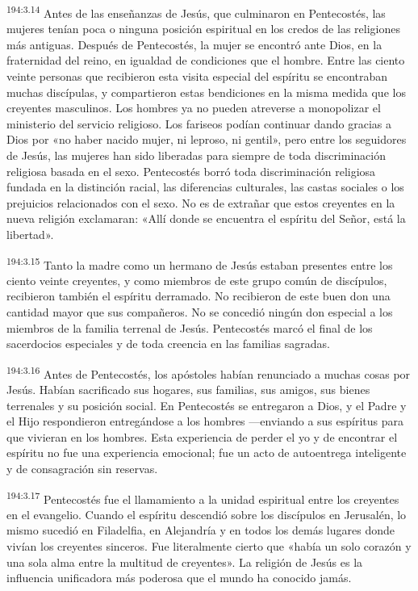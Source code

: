 \par 
\textsuperscript{194:3.14} Antes de las enseñanzas de Jesús, que culminaron en Pentecostés, las mujeres tenían poca o ninguna posición espiritual en los credos de las religiones más antiguas. Después de Pentecostés, la mujer se encontró ante Dios, en la fraternidad del reino, en igualdad de condiciones que el hombre. Entre las ciento veinte personas que recibieron esta visita especial del espíritu se encontraban muchas discípulas, y compartieron estas bendiciones en la misma medida que los creyentes masculinos. Los hombres ya no pueden atreverse a monopolizar el ministerio del servicio religioso. Los fariseos podían continuar dando gracias a Dios por «no haber nacido mujer, ni leproso, ni gentil», pero entre los seguidores de Jesús, las mujeres han sido liberadas para siempre de toda discriminación religiosa basada en el sexo. Pentecostés borró toda discriminación religiosa fundada en la distinción racial, las diferencias culturales, las castas sociales o los prejuicios relacionados con el sexo. No es de extrañar que estos creyentes en la nueva religión exclamaran: «Allí donde se encuentra el espíritu del Señor, está la libertad».

\par 
\textsuperscript{194:3.15} Tanto la madre como un hermano de Jesús estaban presentes entre los ciento veinte creyentes, y como miembros de este grupo común de discípulos, recibieron también el espíritu derramado. No recibieron de este buen don una cantidad mayor que sus compañeros. No se concedió ningún don especial a los miembros de la familia terrenal de Jesús. Pentecostés marcó el final de los sacerdocios especiales y de toda creencia en las familias sagradas.

\par 
\textsuperscript{194:3.16} Antes de Pentecostés, los apóstoles habían renunciado a muchas cosas por Jesús. Habían sacrificado sus hogares, sus familias, sus amigos, sus bienes terrenales y su posición social. En Pentecostés se entregaron a Dios, y el Padre y el Hijo respondieron entregándose a los hombres ---enviando a sus espíritus para que vivieran en los hombres. Esta experiencia de perder el yo y de encontrar el espíritu no fue una experiencia emocional; fue un acto de autoentrega inteligente y de consagración sin reservas.

\par 
\textsuperscript{194:3.17} Pentecostés fue el llamamiento a la unidad espiritual entre los creyentes en el evangelio. Cuando el espíritu descendió sobre los discípulos en Jerusalén, lo mismo sucedió en Filadelfia, en Alejandría y en todos los demás lugares donde vivían los creyentes sinceros. Fue literalmente cierto que «había un solo corazón y una sola alma entre la multitud de creyentes». La religión de Jesús es la influencia unificadora más poderosa que el mundo ha conocido jamás.

